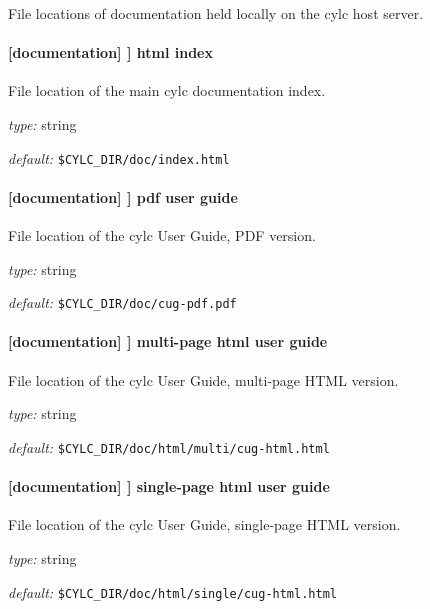 File locations of documentation held locally on the cylc host server.

\paragraph[html index]{[documentation] \textrightarrow [[files]] \textrightarrow html index }

File location of the main cylc documentation index.
\begin{myitemize}
\item {\em type:} string
\item {\em default:} \lstinline=$CYLC_DIR/doc/index.html=
\end{myitemize}

\paragraph[pdf user guide]{[documentation] \textrightarrow [[files]] \textrightarrow pdf user guide }

File location of the cylc User Guide, PDF version.
\begin{myitemize}
\item {\em type:} string
\item {\em default:} \lstinline=$CYLC_DIR/doc/cug-pdf.pdf=
\end{myitemize}

\paragraph[multi-page html user guide]{[documentation] \textrightarrow [[files]] \textrightarrow multi-page html user guide }

File location of the cylc User Guide, multi-page HTML version.
\begin{myitemize}
\item {\em type:} string
\item {\em default:} \lstinline=$CYLC_DIR/doc/html/multi/cug-html.html=
\end{myitemize}

\paragraph[single-page html user guide]{[documentation] \textrightarrow [[files]] \textrightarrow single-page html user guide }

File location of the cylc User Guide, single-page HTML version.
\begin{myitemize}
\item {\em type:} string
\item {\em default:} \lstinline=$CYLC_DIR/doc/html/single/cug-html.html=
\end{myitemize}

